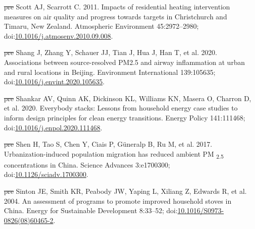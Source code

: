 \documentclass[
  letterpaper,
  DIV=11,
  numbers=noendperiod]{scrartcl}
\newlength{\cslhangindent}
\newenvironment{CSLReferences}[2] %
 {\begin{list}{}{%
  \setlength{\itemindent}{0pt} %
  \setlength{\leftmargin}{0pt} %
  \setlength{\parsep}{0pt} %
  \ifodd #1
   \setlength{\leftmargin}{\cslhangindent} %
   \setlength{\itemindent}{-1\cslhangindent} %
  \fi
  \setlength{\itemsep}{#2\baselineskip}}} %
 {\end{list}} %
\providecommand{\DIFdel}[1]{{\protect\color{red}\sout{#1}}}                      %
\providecommand{\DIFaddbegin}{} %
\providecommand{\DIFaddend}{} %
\providecommand{\DIFdelbegin}{} %
\providecommand{\DIFdelend}{} %
\newcommand{\DIFscaledelfig}{0.5}
\newlength{\DIFdelgraphicswidth} %
\newlength{\DIFdelgraphicsheight} %
\newcommand{\DIFaddincludegraphics}[2][]{{\color{blue}\fbox{\DIFOincludegraphics[#1]{#2}}}} %
\newcommand{\DIFdelincludegraphics}[2][]{%
\sbox{\DIFdelgraphicsbox}{\DIFOincludegraphics[#1]{#2}}%
\settoboxwidth{\DIFdelgraphicswidth}{\DIFdelgraphicsbox} %
\settoboxtotalheight{\DIFdelgraphicsheight}{\DIFdelgraphicsbox} %
\scalebox{\DIFscaledelfig}{%
\parbox[b]{\DIFdelgraphicswidth}{\usebox{\DIFdelgraphicsbox}\\[-\baselineskip] \rule{\DIFdelgraphicswidth}{0em}}\llap{\resizebox{\DIFdelgraphicswidth}{\DIFdelgraphicsheight}{%
\setlength{\unitlength}{\DIFdelgraphicswidth}%
\begin{picture}(1,1)%
\thicklines\linethickness{2pt} %
{\color[rgb]{1,0,0}\put(0,0){\framebox(1,1){}}}%
{\color[rgb]{1,0,0}\put(0,0){\line( 1,1){1}}}%
{\color[rgb]{1,0,0}\put(0,1){\line(1,-1){1}}}%
\end{picture}%
}\hspace*{3pt}}} %
} %
\DeclareRobustCommand{\DIFaddbegin}{\DIFOaddbegin \let\includegraphics\DIFaddincludegraphics} %
\DeclareRobustCommand{\DIFaddend}{\DIFOaddend \let\includegraphics\DIFOincludegraphics} %
\DeclareRobustCommand{\DIFdelbegin}{\DIFOdelbegin \let\includegraphics\DIFdelincludegraphics} %
\DeclareRobustCommand{\DIFdelend}{\DIFOaddend \let\includegraphics\DIFOincludegraphics} %
\begin{document}
\begin{CSLReferences}{1}{1}
\DIFdelbegin %
\DIFdel{pre}%
\DIFdelend \DIFaddbegin {}
\DIFaddend Scott AJ, Scarrott C. 2011. Impacts of residential heating intervention
measures on air quality and progress towards targets in {Christchurch}
and {Timaru}, {New Zealand}. Atmospheric Environment 45:2972--2980;
doi:\href{https://doi.org/10.1016/j.atmosenv.2010.09.008}{10.1016/j.atmosenv.2010.09.008}.

\DIFdelbegin %
\DIFdel{pre}%
\DIFdelend \DIFaddbegin {}
\DIFaddend Shang J, Zhang Y, Schauer JJ, Tian J, Hua J, Han T, et al. 2020.
Associations between source-resolved {PM2}.5 and airway inflammation at
urban and rural locations in {Beijing}. Environment International
139:105635;
doi:\href{https://doi.org/10.1016/j.envint.2020.105635}{10.1016/j.envint.2020.105635}.

\DIFdelbegin %
\DIFdel{pre}%
\DIFdelend \DIFaddbegin {}
\DIFaddend Shankar AV, Quinn AK, Dickinson KL, Williams KN, Masera O, Charron D, et
al. 2020. Everybody stacks: {Lessons} from household energy case studies
to inform design principles for clean energy transitions. Energy Policy
141:111468;
doi:\href{https://doi.org/10.1016/j.enpol.2020.111468}{10.1016/j.enpol.2020.111468}.

\DIFdelbegin %
\DIFdel{pre}%
\DIFdelend \DIFaddbegin {}
\DIFaddend Shen H, Tao S, Chen Y, Ciais P, Güneralp B, Ru M, et al. 2017.
Urbanization-induced population migration has reduced ambient {PM}
{\textsubscript{2.5}} concentrations in {China}. Science Advances
3:e1700300;
doi:\href{https://doi.org/10.1126/sciadv.1700300}{10.1126/sciadv.1700300}.

\DIFdelbegin %
\DIFdel{pre}%
\DIFdelend \DIFaddbegin {}
\DIFaddend Sinton JE, Smith KR, Peabody JW, Yaping L, Xiliang Z, Edwards R, et al.
2004. An assessment of programs to promote improved household stoves in
{China}. Energy for Sustainable Development 8:33--52;
doi:\href{https://doi.org/10.1016/S0973-0826(08)60465-2}{10.1016/S0973-0826(08)60465-2}.


\end{CSLReferences}
\end{document}
